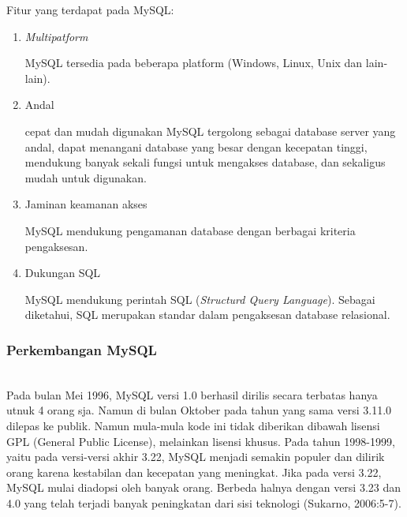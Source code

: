 Fitur yang terdapat pada MySQL:
\begin{enumerate}
	\item \textit{Multipatform}

MySQL tersedia pada beberapa platform (Windows, Linux, Unix dan lain-lain).

	\item Andal
	
cepat dan mudah digunakan MySQL tergolong sebagai database server yang andal, dapat menangani database yang besar dengan kecepatan tinggi, mendukung banyak sekali fungsi untuk mengakses database, dan sekaligus mudah untuk digunakan.

	\item Jaminan keamanan akses
	
MySQL mendukung pengamanan database dengan berbagai kriteria pengaksesan.

	\item Dukungan SQL
	
MySQL mendukung perintah SQL (\textit{Structurd Query Language}). Sebagai diketahui, SQL merupakan standar dalam pengaksesan database relasional.
\end{enumerate}

\subsubsection{Perkembangan MySQL}
\hfill\\
Pada bulan Mei 1996, MySQL versi 1.0 berhasil dirilis secara terbatas hanya utnuk 4 orang sja. Namun di bulan Oktober pada tahun yang sama versi 3.11.0 dilepas ke publik. Namun mula-mula kode ini tidak diberikan dibawah lisensi GPL (General Public License), melainkan lisensi khusus. Pada tahun 1998-1999, yaitu pada versi-versi akhir 3.22, MySQL menjadi semakin populer dan dilirik orang karena kestabilan dan kecepatan yang meningkat. Jika pada versi 3.22, MySQL mulai diadopsi oleh banyak orang. Berbeda halnya dengan versi 3.23 dan 4.0 yang telah terjadi banyak peningkatan dari sisi teknologi (Sukarno, 2006:5-7).

